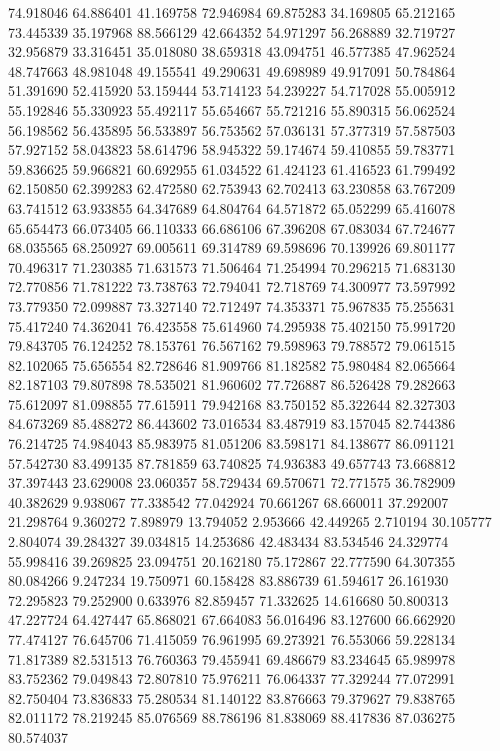 74.918046
64.886401
41.169758
72.946984
69.875283
34.169805
65.212165
73.445339
35.197968
88.566129
42.664352
54.971297
56.268889
32.719727
32.956879
33.316451
35.018080
38.659318
43.094751
46.577385
47.962524
48.747663
48.981048
49.155541
49.290631
49.698989
49.917091
50.784864
51.391690
52.415920
53.159444
53.714123
54.239227
54.717028
55.005912
55.192846
55.330923
55.492117
55.654667
55.721216
55.890315
56.062524
56.198562
56.435895
56.533897
56.753562
57.036131
57.377319
57.587503
57.927152
58.043823
58.614796
58.945322
59.174674
59.410855
59.783771
59.836625
59.966821
60.692955
61.034522
61.424123
61.416523
61.799492
62.150850
62.399283
62.472580
62.753943
62.702413
63.230858
63.767209
63.741512
63.933855
64.347689
64.804764
64.571872
65.052299
65.416078
65.654473
66.073405
66.110333
66.686106
67.396208
67.083034
67.724677
68.035565
68.250927
69.005611
69.314789
69.598696
70.139926
69.801177
70.496317
71.230385
71.631573
71.506464
71.254994
70.296215
71.683130
72.770856
71.781222
73.738763
72.794041
72.718769
74.300977
73.597992
73.779350
72.099887
73.327140
72.712497
74.353371
75.967835
75.255631
75.417240
74.362041
76.423558
75.614960
74.295938
75.402150
75.991720
79.843705
76.124252
78.153761
76.567162
79.598963
79.788572
79.061515
82.102065
75.656554
82.728646
81.909766
81.182582
75.980484
82.065664
82.187103
79.807898
78.535021
81.960602
77.726887
86.526428
79.282663
75.612097
81.098855
77.615911
79.942168
83.750152
85.322644
82.327303
84.673269
85.488272
86.443602
73.016534
83.487919
83.157045
82.744386
76.214725
74.984043
85.983975
81.051206
83.598171
84.138677
86.091121
57.542730
83.499135
87.781859
63.740825
74.936383
49.657743
73.668812
37.397443
23.629008
23.060357
58.729434
69.570671
72.771575
36.782909
40.382629
9.938067
77.338542
77.042924
70.661267
68.660011
37.292007
21.298764
9.360272
7.898979
13.794052
2.953666
42.449265
2.710194
30.105777
2.804074
39.284327
39.034815
14.253686
42.483434
83.534546
24.329774
55.998416
39.269825
23.094751
20.162180
75.172867
22.777590
64.307355
80.084266
9.247234
19.750971
60.158428
83.886739
61.594617
26.161930
72.295823
79.252900
0.633976
82.859457
71.332625
14.616680
50.800313
47.227724
64.427447
65.868021
67.664083
56.016496
83.127600
66.662920
77.474127
76.645706
71.415059
76.961995
69.273921
76.553066
59.228134
71.817389
82.531513
76.760363
79.455941
69.486679
83.234645
65.989978
83.752362
79.049843
72.807810
75.976211
76.064337
77.329244
77.072991
82.750404
73.836833
75.280534
81.140122
83.876663
79.379627
79.838765
82.011172
78.219245
85.076569
88.786196
81.838069
88.417836
87.036275
80.574037
